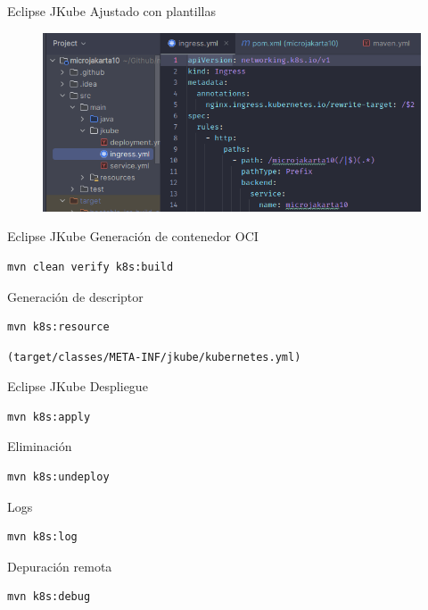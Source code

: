 \documentclass[aspectratio=169]{beamer}
\begin{document}
\begin{frame}[fragile]{Eclipse JKube}
Ajustado con plantillas

\begin{figure}
\centering
\includegraphics[width=0.9\linewidth]{Images/plantillas}

\end{figure}


\end{frame}

\begin{frame}[fragile]{Eclipse JKube}
Generación de contenedor OCI
\begin{lstlisting}[language=bash]
mvn clean verify k8s:build
\end{lstlisting}

Generación de descriptor 
\begin{lstlisting}[language=bash]
mvn k8s:resource
\end{lstlisting}
\begin{verbatim}
(target/classes/META-INF/jkube/kubernetes.yml)
\end{verbatim}
\end{frame}

\begin{frame}[fragile]{Eclipse JKube}
Despliegue
\begin{lstlisting}[language=bash]
mvn k8s:apply
\end{lstlisting}

Eliminación
\begin{lstlisting}[language=bash]
mvn k8s:undeploy
\end{lstlisting}

Logs
\begin{lstlisting}[language=bash]
mvn k8s:log
\end{lstlisting}

Depuración remota
\begin{lstlisting}[language=bash]
mvn k8s:debug
\end{lstlisting}
\end{frame}
\end{document}

